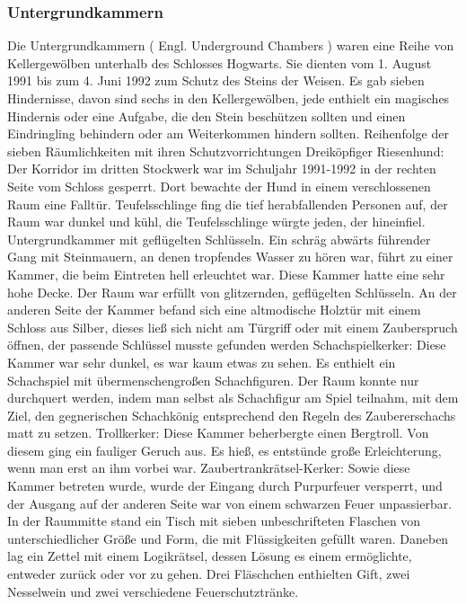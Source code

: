 \documentclass[a4paper, 10pt]{article}
\begin{document}
\subsubsection*{\large Untergrundkammern}
Die Untergrundkammern (  Engl.  Underground Chambers ) waren eine Reihe von Kellergewölben unterhalb des Schlosses Hogwarts. Sie dienten vom 1. August 1991 bis zum 4. Juni 1992 zum Schutz des Steins der Weisen. Es gab sieben Hindernisse, davon sind sechs in den Kellergewölben, jede enthielt ein magisches Hindernis oder eine Aufgabe, die den Stein beschützen sollten und einen Eindringling behindern oder am Weiterkommen hindern sollten.
\vspace{10pt}
\newline
Reihenfolge der sieben Räumlichkeiten mit ihren Schutzvorrichtungen
\vspace{10pt}
\newline
Dreiköpfiger Riesenhund: Der Korridor im dritten Stockwerk war im Schuljahr 1991-1992 in der rechten Seite vom Schloss gesperrt. Dort bewachte der Hund in einem verschlossenen Raum eine Falltür.
Teufelsschlinge fing die tief herabfallenden Personen auf, der Raum war dunkel und kühl, die Teufelsschlinge würgte jeden, der hineinfiel.
\vspace{10pt}
\newline
Untergrundkammer mit geflügelten Schlüsseln. Ein schräg abwärts führender Gang mit Steinmauern, an denen tropfendes Wasser zu hören war, führt zu einer Kammer, die beim Eintreten hell erleuchtet war. Diese Kammer hatte eine sehr hohe Decke. Der Raum war erfüllt von glitzernden, geflügelten Schlüsseln. An der anderen Seite der Kammer befand sich eine altmodische Holztür mit einem Schloss aus Silber, dieses ließ sich nicht am Türgriff oder mit einem Zauberspruch öffnen, der passende Schlüssel musste gefunden werden
\vspace{10pt}
\newline
Schachspielkerker: Diese Kammer war sehr dunkel, es war kaum etwas zu sehen. Es enthielt ein Schachspiel mit übermenschengroßen Schachfiguren. Der Raum konnte nur durchquert werden, indem man selbst als Schachfigur am Spiel teilnahm, mit dem Ziel, den gegnerischen Schachkönig entsprechend den Regeln des Zaubererschachs matt zu setzen.
\vspace{10pt}
\newline
Trollkerker: Diese Kammer beherbergte einen Bergtroll. Von diesem ging ein fauliger Geruch aus. Es hieß, es entstünde große Erleichterung, wenn man erst an ihm vorbei war.
Zaubertrankrätsel-Kerker: Sowie diese Kammer betreten wurde, wurde der Eingang durch Purpurfeuer versperrt, und der Ausgang auf der anderen Seite war von einem schwarzen Feuer unpassierbar. In der Raummitte stand ein Tisch mit sieben unbeschrifteten Flaschen von unterschiedlicher Größe und Form, die mit Flüssigkeiten gefüllt waren. Daneben lag ein Zettel mit einem Logikrätsel, dessen Lösung es einem ermöglichte, entweder zurück oder vor zu gehen. Drei Fläschchen enthielten Gift, zwei Nesselwein und zwei verschiedene Feuerschutztränke.
\end{document}
